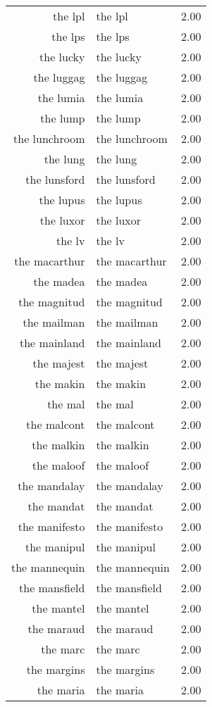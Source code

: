 \begin{table}[ht]
\begin{tabular}{rlr}
  the lpl & the lpl & 2.00 \\ 
  the lps & the lps & 2.00 \\ 
  the lucky & the lucky & 2.00 \\ 
  the luggag & the luggag & 2.00 \\ 
  the lumia & the lumia & 2.00 \\ 
  the lump & the lump & 2.00 \\ 
  the lunchroom & the lunchroom & 2.00 \\ 
  the lung & the lung & 2.00 \\ 
  the lunsford & the lunsford & 2.00 \\ 
  the lupus & the lupus & 2.00 \\ 
  the luxor & the luxor & 2.00 \\ 
  the lv & the lv & 2.00 \\ 
  the macarthur & the macarthur & 2.00 \\ 
  the madea & the madea & 2.00 \\ 
  the magnitud & the magnitud & 2.00 \\ 
  the mailman & the mailman & 2.00 \\ 
  the mainland & the mainland & 2.00 \\ 
  the majest & the majest & 2.00 \\ 
  the makin & the makin & 2.00 \\ 
  the mal & the mal & 2.00 \\ 
  the malcont & the malcont & 2.00 \\ 
  the malkin & the malkin & 2.00 \\ 
  the maloof & the maloof & 2.00 \\ 
  the mandalay & the mandalay & 2.00 \\ 
  the mandat & the mandat & 2.00 \\ 
  the manifesto & the manifesto & 2.00 \\ 
  the manipul & the manipul & 2.00 \\ 
  the mannequin & the mannequin & 2.00 \\ 
  the mansfield & the mansfield & 2.00 \\ 
  the mantel & the mantel & 2.00 \\ 
  the maraud & the maraud & 2.00 \\ 
  the marc & the marc & 2.00 \\ 
  the margins & the margins & 2.00 \\ 
  the maria & the maria & 2.00 \\ 

\end{tabular}
\end{table}
